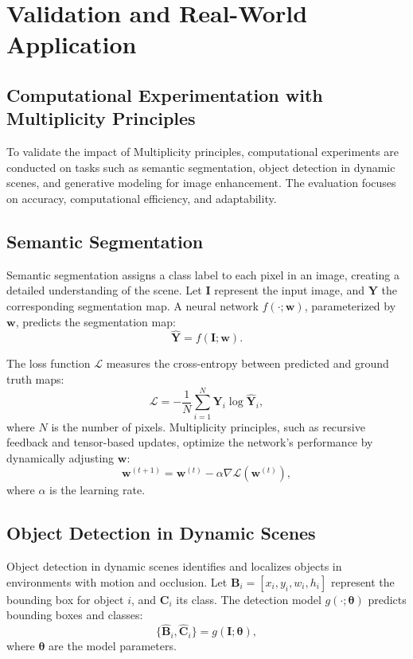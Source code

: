 \documentclass{article}
\theoremstyle{plain}
\begin{document}
\section{Validation and Real-World Application}

\subsection{Computational Experimentation with Multiplicity Principles}
To validate the impact of Multiplicity principles, computational experiments are conducted on tasks such as semantic segmentation, object detection in dynamic scenes, and generative modeling for image enhancement. The evaluation focuses on accuracy, computational efficiency, and adaptability.

\subsection{Semantic Segmentation}
Semantic segmentation assigns a class label to each pixel in an image, creating a detailed understanding of the scene. Let \( \mathbf{I} \) represent the input image, and \( \mathbf{Y} \) the corresponding segmentation map. A neural network \( f(\cdot; \mathbf{w}) \), parameterized by \( \mathbf{w} \), predicts the segmentation map:
\begin{equation}
\hat{\mathbf{Y}} = f(\mathbf{I}; \mathbf{w}).
\end{equation}

The loss function \( \mathcal{L} \) measures the cross-entropy between predicted and ground truth maps:
\begin{equation}
\mathcal{L} = -\frac{1}{N} \sum_{i=1}^N \mathbf{Y}_i \log \hat{\mathbf{Y}}_i,
\end{equation}
where \( N \) is the number of pixels. Multiplicity principles, such as recursive feedback and tensor-based updates, optimize the network’s performance by dynamically adjusting \( \mathbf{w} \):
\begin{equation}
\mathbf{w}^{(t+1)} = \mathbf{w}^{(t)} - \alpha \nabla \mathcal{L}(\mathbf{w}^{(t)}),
\end{equation}
where \( \alpha \) is the learning rate.

\subsection{Object Detection in Dynamic Scenes}
Object detection in dynamic scenes identifies and localizes objects in environments with motion and occlusion. Let \( \mathbf{B}_i = [x_i, y_i, w_i, h_i] \) represent the bounding box for object \( i \), and \( \mathbf{C}_i \) its class. The detection model \( g(\cdot; \mathbf{\theta}) \) predicts bounding boxes and classes:
\begin{equation}
\{\hat{\mathbf{B}}_i, \hat{\mathbf{C}}_i\} = g(\mathbf{I}; \mathbf{\theta}),
\end{equation}
where \( \mathbf{\theta} \) are the model parameters.
\end{document}
